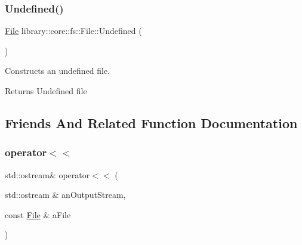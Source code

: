 \subsubsection{\texorpdfstring{Undefined()}{Undefined()}}
{\footnotesize\ttfamily \mbox{\hyperlink{classlibrary_1_1core_1_1fs_1_1_file}{File}} library\+::core\+::fs\+::\+File\+::\+Undefined (\begin{DoxyParamCaption}{ }\end{DoxyParamCaption})\hspace{0.3cm}{\ttfamily [static]}}



Constructs an undefined file. 


\begin{DoxyCode}{0}
\end{DoxyCode}


\begin{DoxyReturn}{Returns}
Undefined file 
\end{DoxyReturn}


\subsection{Friends And Related Function Documentation}
\mbox{\label{classlibrary_1_1core_1_1fs_1_1_file_a82ce9f27653427d53ecb90de978f4f68}} 
\subsubsection{\texorpdfstring{operator$<$$<$}{operator<<}}
{\footnotesize\ttfamily std\+::ostream\& operator$<$$<$ (\begin{DoxyParamCaption}\item[{std\+::ostream \&}]{an\+Output\+Stream,  }\item[{const \mbox{\hyperlink{classlibrary_1_1core_1_1fs_1_1_file}{File}} \&}]{a\+File }\end{DoxyParamCaption})\hspace{0.3cm}{\ttfamily [friend]}}



